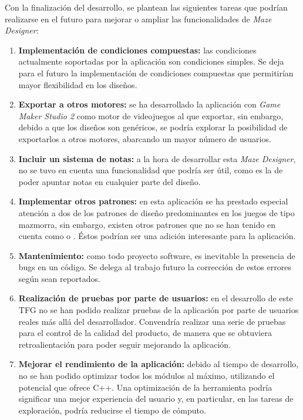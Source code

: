 Con la finalización del desarrollo, se plantean las siguientes tareas que podrían realizarse en el futuro para mejorar o ampliar las funcionalidades de \textit{Maze Designer}:
\begin{enumerate}
	\item \textbf{Implementación de condiciones compuestas:} las condiciones actualmente soportadas por la aplicación son condiciones simples. Se deja para el futuro la implementación de condiciones compuestas que permitirían mayor flexibilidad en los diseños.
	\item \textbf{Exportar a otros motores:} se ha desarrollado la aplicación con \textit{Game Maker Studio 2} como motor de videojuegos al que exportar, sin embargo, debido a que los diseños son genéricos, se podría explorar la posibilidad de exportarlos a otros motores, abarcando un mayor número de usuarios.
	\item \textbf{Incluir un sistema de notas:} a la hora de desarrollar esta \textit{Maze Designer}, no se tuvo en cuenta una funcionalidad que podría ser útil, como es la de poder apuntar notas en cualquier parte del diseño.
	\item \textbf{Implementar otros patrones:} en esta aplicación se ha prestado especial atención a dos de los patrones de diseño predominantes en los juegos de tipo mazmorra, sin embargo, existen otros patrones que no se han tenido en cuenta como  o . Éstos podrían ser una adición interesante para la aplicación.
	\item \textbf{Mantenimiento:} como todo proyecto software, es inevitable la presencia de bugs en un código. Se delega al trabajo futuro la corrección de estos errores según sean reportados.
	\item \textbf{Realización de pruebas por parte de usuarios:} en el desarrollo de este TFG no se han podido realizar pruebas de la aplicación por parte de usuarios reales más allá del desarrollador. Convendría realizar una serie de pruebas para el control de la calidad del producto, de manera que se obtuviera retroalientación para poder seguir mejorando la aplicación.
	\item \textbf{Mejorar el rendimiento de la aplicación:} debido al tiempo de desarrollo, no se han podido optimizar todos los módulos al máximo, utilizando el potencial que ofrece C++. Una optimización de la herramienta podría significar una mejor experiencia del usuario y, en particular, en las tareas de exploración, podría reducirse el tiempo de cómputo.
\end{enumerate}